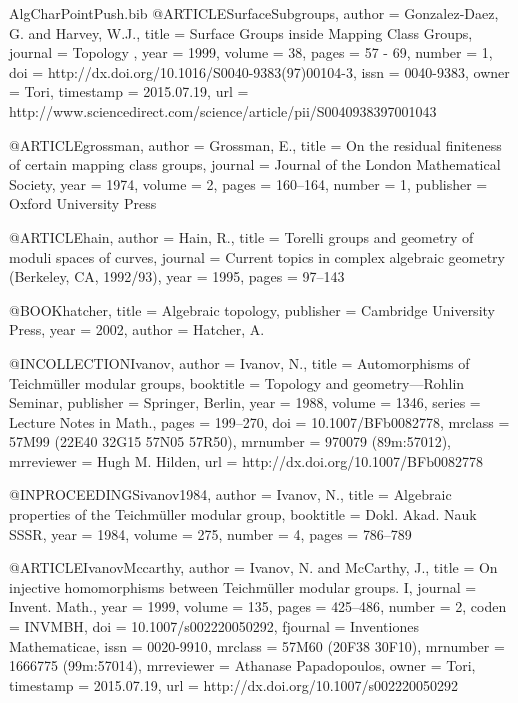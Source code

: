 \documentclass[a4paper]{amsproc}
\theoremstyle{TheoremNum}
\theoremstyle{Theorembold}
\theoremstyle{TheoremboldDef}
\theoremstyle{TheoremboldRem}
\theoremstyle{TheoremboldRem}
\begin{document}
\begin{filecontents}{AlgCharPointPush.bib}
@ARTICLE{SurfaceSubgroups,
  author = {Gonzalez-Daez, G. and Harvey, W.J.},
  title = {Surface Groups inside Mapping Class Groups},
  journal = {Topology },
  year = {1999},
  volume = {38},
  pages = {57 - 69},
  number = {1},
  doi = {http://dx.doi.org/10.1016/S0040-9383(97)00104-3},
  issn = {0040-9383},
  owner = {Tori},
  timestamp = {2015.07.19},
  url = {http://www.sciencedirect.com/science/article/pii/S0040938397001043}
}

@ARTICLE{grossman,
  author = {Grossman, E.},
  title = {On the residual finiteness of certain mapping class groups},
  journal = {Journal of the London Mathematical Society},
  year = {1974},
  volume = {2},
  pages = {160--164},
  number = {1},
  publisher = {Oxford University Press}
}

@ARTICLE{hain,
  author = {Hain, R.},
  title = {Torelli groups and geometry of moduli spaces of curves},
  journal = {Current topics in complex algebraic geometry (Berkeley, CA, 1992/93)},
  year = {1995},
  pages = {97--143}
}

@BOOK{hatcher,
  title = {Algebraic topology},
  publisher = {Cambridge University Press},
  year = {2002},
  author = {Hatcher, A.}
}

@INCOLLECTION{Ivanov,
  author = {Ivanov, N.},
  title = {Automorphisms of {T}eichm\"uller modular groups},
  booktitle = {Topology and geometry---{R}ohlin {S}eminar},
  publisher = {Springer, Berlin},
  year = {1988},
  volume = {1346},
  series = {Lecture Notes in Math.},
  pages = {199--270},
  doi = {10.1007/BFb0082778},
  mrclass = {57M99 (22E40 32G15 57N05 57R50)},
  mrnumber = {970079 (89m:57012)},
  mrreviewer = {Hugh M. Hilden},
  url = {http://dx.doi.org/10.1007/BFb0082778}
}

@INPROCEEDINGS{ivanov1984,
  author = {Ivanov, N.},
  title = {Algebraic properties of the {T}eichm{\"u}ller modular group},
  booktitle = {Dokl. Akad. Nauk SSSR},
  year = {1984},
  volume = {275},
  number = {4},
  pages = {786--789}
}

@ARTICLE{IvanovMccarthy,
  author = {Ivanov, N. and McCarthy, J.},
  title = {On injective homomorphisms between {T}eichm\"uller modular groups.
	{I}},
  journal = {Invent. Math.},
  year = {1999},
  volume = {135},
  pages = {425--486},
  number = {2},
  coden = {INVMBH},
  doi = {10.1007/s002220050292},
  fjournal = {Inventiones Mathematicae},
  issn = {0020-9910},
  mrclass = {57M60 (20F38 30F10)},
  mrnumber = {1666775 (99m:57014)},
  mrreviewer = {Athanase Papadopoulos},
  owner = {Tori},
  timestamp = {2015.07.19},
  url = {http://dx.doi.org/10.1007/s002220050292}
}


\end{filecontents}
\end{document}
